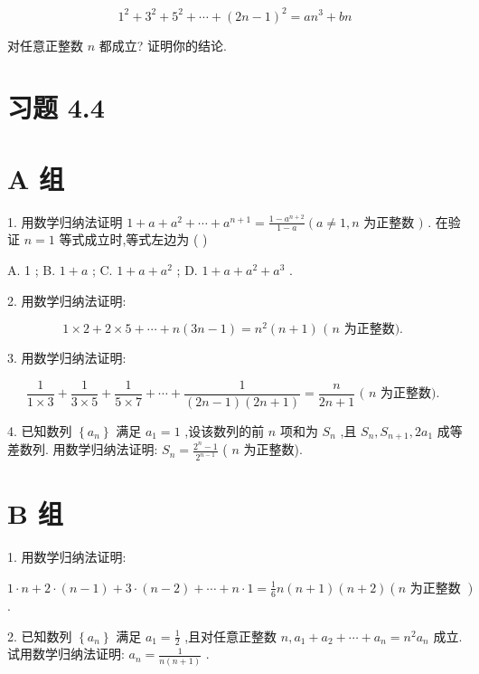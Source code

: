 \documentclass[10pt]{article}
\begin{document}
\[
{1}^{2} + {3}^{2} + {5}^{2} + \cdots  + {\left( 2n - 1\right) }^{2} = a{n}^{3} + {bn}
\]

对任意正整数 \(n\) 都成立? 证明你的结论.

\section*{习题 4.4}

\section*{A 组}

1. 用数学归纳法证明 \(1 + a + {a}^{2} + \cdots  + {a}^{n + 1} = \frac{1 - {a}^{n + 2}}{1 - a}\left( {a \neq  1,n}\right.\) 为正整数 \()\) . 在验证 \(n = 1\) 等式成立时,等式左边为 ( )

A. 1 ; B. \(1 + a\) ; C. \(1 + a + {a}^{2}\) ; D. \(1 + a + {a}^{2} + {a}^{3}\) .

2. 用数学归纳法证明:

\[
1 \times  2 + 2 \times  5 + \cdots  + n\left( {{3n} - 1}\right)  = {n}^{2}\left( {n + 1}\right) \text{ ( }n\text{ 为正整数). }
\]

3. 用数学归纳法证明:

\[
\frac{1}{1 \times  3} + \frac{1}{3 \times  5} + \frac{1}{5 \times  7} + \cdots  + \frac{1}{\left( {{2n} - 1}\right) \left( {{2n} + 1}\right) } = \frac{n}{{2n} + 1}\text{ ( }n\text{ 为正整数). }
\]

4. 已知数列 \(\left\{  {a}_{n}\right\}\) 满足 \({a}_{1} = 1\) ,设该数列的前 \(n\) 项和为 \({S}_{n}\) ,且 \({S}_{n},{S}_{n + 1},2{a}_{1}\) 成等差数列. 用数学归纳法证明: \({S}_{n} = \frac{{2}^{n} - 1}{{2}^{n - 1}}\) ( \(n\) 为正整数).

\section*{B 组}

1. 用数学归纳法证明:

\(1 \cdot  n + 2 \cdot  \left( {n - 1}\right)  + 3 \cdot  \left( {n - 2}\right)  + \cdots  + n \cdot  1 = \frac{1}{6}n\left( {n + 1}\right) \left( {n + 2}\right) \left( {n\text{ 为正整数 }}\right)\) .

2. 已知数列 \(\left\{  {a}_{n}\right\}\) 满足 \({a}_{1} = \frac{1}{2}\) ,且对任意正整数 \(n,{a}_{1} + {a}_{2} + \cdots  + {a}_{n} = {n}^{2}{a}_{n}\) 成立. 试用数学归纳法证明: \({a}_{n} = \frac{1}{n\left( {n + 1}\right) }\) .
\end{document}
